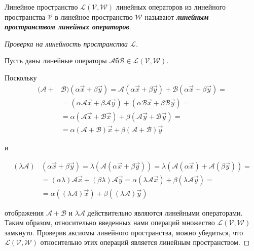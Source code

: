 \begin{definition}
    Линейное пространство $\mathcal{L}(\mathcal{V}, \mathcal{W})$ линейных операторов из линейного пространства $\mathcal{V}$ в линейное пространство $\mathcal{W}$ называют \textbf{\textit{линейным пространством линейных операторов}}.
\end{definition}

\begin{proof}[Проверка на линейность пространства $\mathcal{L}$]~

    Пусть даны линейные операторы $\mathscr{A}б \mathscr{B} \in \mathcal{L}(\mathcal{V}, \mathcal{W})$. 

    Поскольку
    \begin{align*}
        (\mathscr{A} + &\mathscr{B})(\alpha\vec{x} + \beta \vec{y}) = \mathscr{A}(\alpha\vec{x} + \beta \vec{y}) + \mathscr{B}(\alpha\vec{x} + \beta \vec{y}) = \\
        &= (\alpha\mathscr{A}\vec{x} + \beta\mathscr{A}\vec{y}) + (\alpha\mathscr{B}\vec{x} + \beta\mathscr{B}\vec{y}) = \\
        &= \alpha(\mathscr{A}\vec{x} + \mathscr{B}\vec{x}) + \beta(\mathscr{A}\vec{y} + \mathscr{B}\vec{y}) = \\
        &= \alpha(\mathscr{A} + \mathscr{B})\vec{x} + \beta(\mathscr{A} + \mathscr{B})\vec{y}
    \end{align*}

    и

    \begin{align*}
        (\lambda\mathscr{A})&(\alpha\vec{x} + \beta \vec{y}) = \lambda(\mathscr{A}(\alpha\vec{x} + \beta\vec{y})) = \lambda (\mathscr{A}(\alpha\vec{x}) + \mathscr{A}(\beta\vec{y})) = \\ 
        &= (\alpha \lambda)\mathscr{A}\vec{x} + (\beta \lambda)\mathscr{A}\vec{y} = \alpha(\lambda \mathscr{A}\vec{x}) + \beta(\lambda \mathscr{A}\vec{y}) = \\
        &= \alpha((\lambda\mathscr{A})\vec{x}) + \beta((\lambda\mathscr{A})\vec{y})
    \end{align*}

    отображения $\mathscr{A} + \mathscr{B}$ и $\lambda \mathscr{A}$ действительно являются линейными операторами. Таким образом, относительно введенных нами операций множество $\mathcal{L}(\mathcal{V}, \mathcal{W})$ замкнуто. Проверив аксиомы линейного пространства, можно убедиться, что $\mathcal{L}(\mathcal{V}, \mathcal{W})$ относительно этих операций является линейным пространством.
\end{proof}